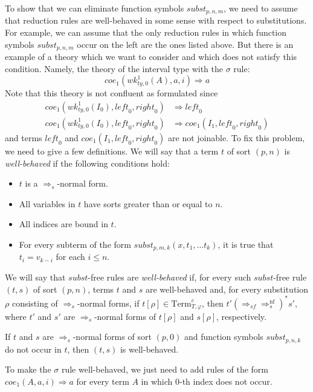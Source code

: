 \documentclass[reqno]{amsart}
\theoremstyle{definition}
\theoremstyle{remark}
\newcommand{\nf}{\mathrm{nf}}
\newcommand{\Term}{\mathrm{Term}}
\newcommand{\leftI}{\mathit{left}}
\newcommand{\rightI}{\mathit{right}}
\newcommand{\coe}{\mathit{coe}}
\newcommand{\subst}{\mathit{subst}}
\newcommand{\wk}{\mathit{wk}}
\newcommand{\ty}{\mathit{ty}}
\numberwithin{figure}{section}
\begin{document}
To show that we can eliminate function symbols $\subst_{p,n,m}$, we need to assume that reduction rules are well-behaved in some sense with respect to substitutions.
For example, we can assume that the only reduction rules in which function symbols $\subst_{p,n,m}$ occur on the left are the ones listed above.
But there is an example of a theory which we want to consider and which does not satisfy this condition.
Namely, the theory of the interval type with the $\sigma$ rule:
\[ \coe_1(\wk^1_{\ty,0}(A), a, i) \Rightarrow a \]
Note that this theory is not confluent as formulated since
\begin{align*}
\coe_1(\wk^1_{\ty,0}(I_0), \leftI_0, \rightI_0) & \Rightarrow \leftI_0 \\
\coe_1(\wk^1_{\ty,0}(I_0), \leftI_0, \rightI_0) & \Rightarrow \coe_1(I_1, \leftI_0, \rightI_0)
\end{align*}
and terms $\leftI_0$ and $\coe_1(I_1, \leftI_0, \rightI_0)$ are not joinable.
To fix this problem, we need to give a few definitions.
We will say that a term $t$ of sort $(p,n)$ is \emph{well-behaved} if the following conditions hold:
\begin{itemize}
\item $t$ is a $\Rightarrow_s$-normal form.
\item All variables in $t$ have sorts greater than or equal to $n$.
\item All indices are bound in $t$.
\item For every subterm of the form $\subst_{p,m,k}(x, t_1, \ldots t_k)$, it is true that $t_i = v_{k-i}$ for each $i \leq n$.
\end{itemize}
We will say that $\subst$-free rules are \emph{well-behaved} if, for every such $\subst$-free rule $(t,s)$ of sort $(p,n)$, terms $t$ and $s$ are well-behaved and,
for every substitution $\rho$ consisting of $\Rightarrow_s$-normal forms, if $t[\rho] \in \Term_{T,\varphi}^c$, then $t' (\Rightarrow_{sf} \Rightarrow_s^\nf)^* s'$,
where $t'$ and $s'$ are $\Rightarrow_s$-normal forms of $t[\rho]$ and $s[\rho]$, respectively.

\begin{example}
If $t$ and $s$ are $\Rightarrow_s$-normal forms of sort $(p,0)$ and function symbols $\subst_{p,n,k}$ do not occur in $t$, then $(t,s)$ is well-behaved.
\end{example}

\begin{example}
To make the $\sigma$ rule well-behaved, we just need to add rules of the form $\coe_1(A, a, i) \Rightarrow a$ for every term $A$ in which $0$-th index does not occur.
\end{example}
\end{document}
